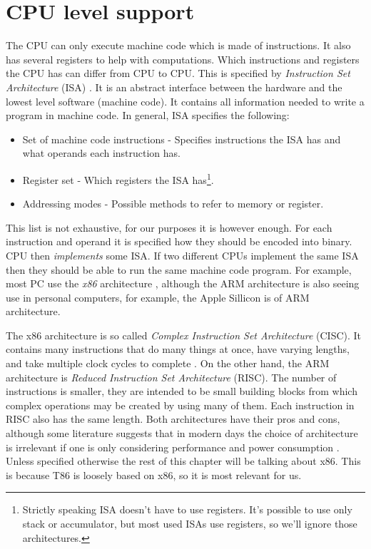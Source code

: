 \section{CPU level support}
The CPU can only execute machine code which is made of instructions. It also
has several registers to help with computations. Which instructions and
registers the CPU has can differ from CPU to CPU. This is specified by
\textit{Instruction Set Architecture} (ISA) \cite{aps-isa}. It is an abstract
interface between the hardware and the lowest level software (machine code). It
contains all information needed to write a program in machine code. In general,
ISA specifies the following: 
\begin{itemize}
    \item Set of machine code instructions - Specifies instructions the ISA has
        and what operands each instruction has.
    \item Register set - Which registers the ISA has\footnote{Strictly speaking
        ISA doesn't have to use registers. It's possible to use only stack or
        accumulator, but most used ISAs use registers, so we'll ignore those
        architectures. }.   
    \item Addressing modes - Possible methods to refer to memory or register. 
\end{itemize}
This list is not exhaustive, for our purposes it is however enough. For each
instruction and operand it is specified how they should be encoded into binary.
CPU then \textit{implements} some ISA. If two different CPUs implement the same
ISA then they should be able to run the same machine code program. For example,
most PC use the \textit{x86} architecture \cite{aps-isa}, although the ARM
architecture is also seeing use in personal computers, for example, the Apple
Sillicon is of ARM architecture.

The x86 architecture is so called \textit{Complex Instruction Set Architecture}
(CISC). It contains many instructions that do many things at once, have varying
lengths, and take multiple clock cycles to complete \cite{intel-manual}. On the
other hand, the ARM architecture is \textit{Reduced Instruction Set
Architecture} (RISC). The number of instructions is smaller, they are intended
to be small building blocks from which complex operations may be created by
using many of them. Each instruction in RISC also has the same length. Both
architectures have their pros and cons, although some literature suggests that
in modern days the choice of architecture is irrelevant if one is only
considering performance and power consumption \cite{riscvscisc1, riscvscisc2}.
Unless specified otherwise the rest of this chapter will be talking about x86.
This is because T86  is loosely based on x86, so it is most relevant
for us.

